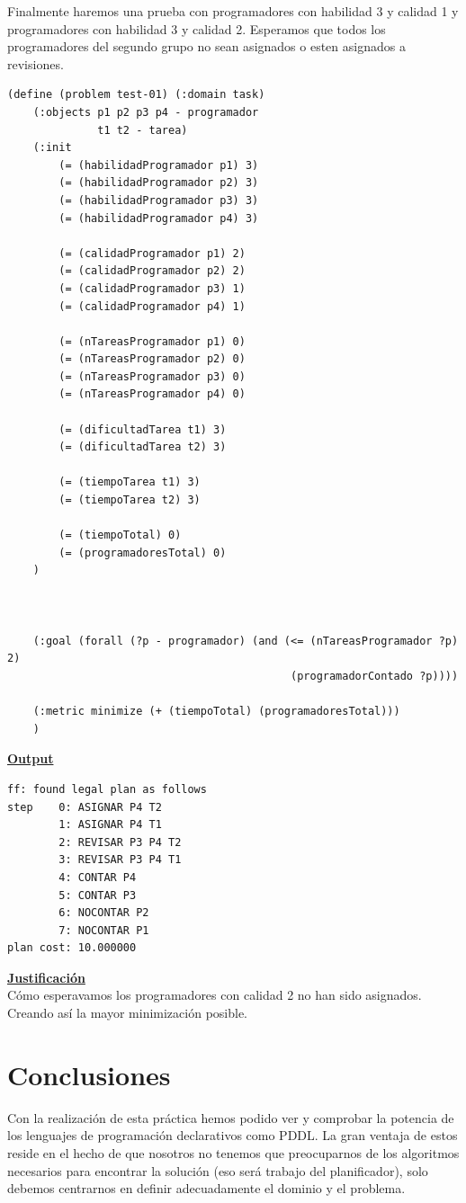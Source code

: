 \documentclass[11pt]{article}
\begin{document}
Finalmente haremos una prueba con programadores con habilidad 3 y calidad 1 y programadores con habilidad 3 y calidad 2. Esperamos que todos los programadores del segundo grupo no sean asignados o esten asignados a revisiones.
\medskip
\begin{verbatim}
(define (problem test-01) (:domain task)
    (:objects p1 p2 p3 p4 - programador
			  t1 t2 - tarea)
    (:init
        (= (habilidadProgramador p1) 3)
        (= (habilidadProgramador p2) 3)
        (= (habilidadProgramador p3) 3)
        (= (habilidadProgramador p4) 3)
        
        (= (calidadProgramador p1) 2)
        (= (calidadProgramador p2) 2)
        (= (calidadProgramador p3) 1)
        (= (calidadProgramador p4) 1)
        
        (= (nTareasProgramador p1) 0)
        (= (nTareasProgramador p2) 0)
        (= (nTareasProgramador p3) 0)
        (= (nTareasProgramador p4) 0)
        
        (= (dificultadTarea t1) 3)
        (= (dificultadTarea t2) 3)
        
        (= (tiempoTarea t1) 3)
        (= (tiempoTarea t2) 3)
        
        (= (tiempoTotal) 0)
        (= (programadoresTotal) 0)
    )

    

    (:goal (forall (?p - programador) (and (<= (nTareasProgramador ?p) 2)
											(programadorContado ?p))))
    
    (:metric minimize (+ (tiempoTotal) (programadoresTotal)))
    )
\end{verbatim}

\noindent \underline{\textbf{Output}}
\medskip
\begin{verbatim}
ff: found legal plan as follows
step    0: ASIGNAR P4 T2
        1: ASIGNAR P4 T1
        2: REVISAR P3 P4 T2
        3: REVISAR P3 P4 T1
        4: CONTAR P4
        5: CONTAR P3
        6: NOCONTAR P2
        7: NOCONTAR P1
plan cost: 10.000000
\end{verbatim}
\noindent \underline{\textbf{Justificación}} \\

Cómo esperavamos los programadores con calidad 2 no han sido asignados. Creando así la mayor minimización posible.
\medskip

\newpage
\section{Conclusiones}
Con la realización de esta práctica hemos podido ver y comprobar la potencia de los lenguajes de programación declarativos como PDDL. La gran ventaja de estos reside en el hecho de que nosotros no tenemos que preocuparnos de los algoritmos necesarios para encontrar la solución (eso será trabajo del planificador), solo debemos centrarnos en definir adecuadamente el dominio y el problema. 
\end{document}
